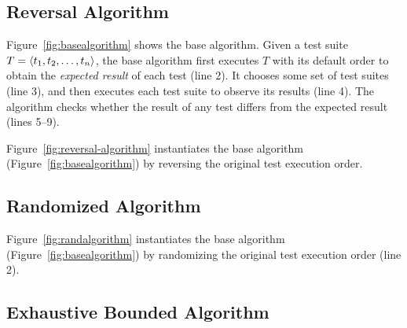 \subsection{Reversal Algorithm}
\label{sec:reversal}


Figure~\ref{fig:basealgorithm} shows the base algorithm.
Given a test suite $T =  \langle t_1, t_2, \ldots, t_n \rangle $, the base algorithm
first executes $T$ with its default order
to obtain the \emph{expected result} of each test (line 2).
It chooses some set of test suites (line 3), and then executes
each test suite
to observe its results (line 4). The algorithm checks
whether the result of any test differs from the
expected result (lines 5--9). 

Figure~\ref{fig:reversal-algorithm} instantiates the
base algorithm (Figure~\ref{fig:basealgorithm})
by reversing the original test execution
order.


\subsection{Randomized Algorithm}
\label{sec:randomized}

Figure~\ref{fig:randalgorithm} instantiates the
base algorithm (Figure~\ref{fig:basealgorithm})
by randomizing the original test execution
order (line 2).





\subsection{Exhaustive Bounded Algorithm}
\label{sec:basic}

